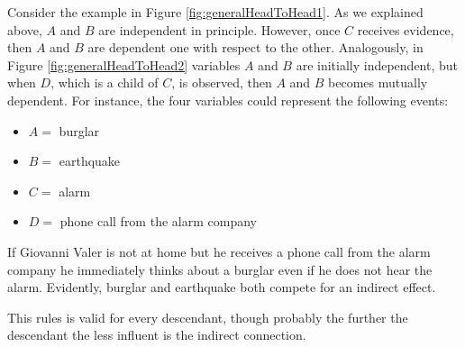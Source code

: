Consider the example in Figure \ref{fig:generalHeadToHead1}. As we explained
above, $A$ and $B$ are independent in principle. However, once $C$ receives evidence,
then $A$ and $B$ are dependent one with respect to the other. Analogously, in
Figure \ref{fig:generalHeadToHead2} variables $A$ and $B$ are initially
independent, but when $D$, which is a child of $C$, is observed, then $A$ and
$B$ becomes mutually dependent. For instance, the four variables could represent
the following events:
\begin{itemize}
	\item $A=$ burglar

	\item $B=$ earthquake

	\item $C=$ alarm

	\item $D=$ phone call from the alarm company
\end{itemize}
If Giovanni Valer is not at home but he receives a phone call from the alarm company
he immediately thinks about a burglar even if he does not hear the alarm.
Evidently, burglar and earthquake both compete for an indirect effect.
\newline

This rules is valid for every descendant, though probably the further the
descendant the less influent is the indirect connection.

